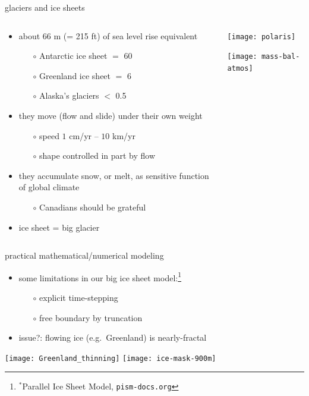 \documentclass[xcolor={dvipsnames}]{beamer}
\begin{document}
\begin{frame}{glaciers and ice sheets}

\begin{columns}
\begin{column}{0.45\textwidth}
\begin{itemize}
\small
\item about 66 m (= 215 ft) of sea level rise equivalent
  \begin{itemize}
  \scriptsize
  \item[$\circ$] Antarctic ice sheet $=$ 60
  \item[$\circ$] Greenland ice sheet $=$ 6
  \item[$\circ$] Alaska's glaciers $<$ 0.5
  \end{itemize}
\small
\item they move (flow and slide) under their own weight
  \begin{itemize}
  \scriptsize
  \item[$\circ$] speed $1$ cm/yr -- $10$ km/yr
  \item[$\circ$] shape controlled in part by flow
  \end{itemize}
\small
\item they accumulate snow, or melt, as sensitive function of global climate
  \begin{itemize}
  \scriptsize
  \item[$\circ$] Canadians should be grateful
  \end{itemize}
\small
\item ice sheet = big glacier
\end{itemize}
\end{column}
\begin{column}{0.55\textwidth}
\texttt{[image: polaris]}

\texttt{[image: mass-bal-atmos]}
\end{column}
\end{columns}
\end{frame}


\begin{frame}{practical mathematical/numerical modeling}

\begin{itemize}
\small
\item some limitations in our big ice sheet model:\footnote{$^*$Parallel Ice Sheet Model, \texttt{pism-docs.org}}
  \begin{itemize}
  \item[$\circ$] explicit time-stepping
  \item[$\circ$] free boundary by truncation
  \end{itemize}
\item issue?: flowing ice (e.g.~Greenland) is nearly-fractal
\end{itemize}

\begin{center}
\texttt{[image: Greenland\_thinning]} \quad \texttt{[image: ice-mask-900m]}
\end{center}
\end{frame}
\end{document}
